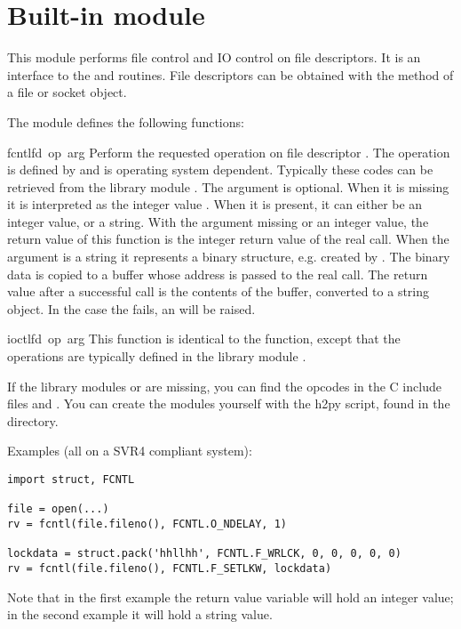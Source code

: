 \section{Built-in module }

This module performs file control and IO control on file descriptors.
It is an interface to the  and  \UNIX routines.
File descriptors can be obtained with the  method of a
file or socket object.

The module defines the following functions:

\renewcommand{\indexsubitem}{(in module struct)}

\begin{funcdesc}{fcntl}{fd\, op\, arg}
  Perform the requested operation on file descriptor .
  The operation is defined by  and is operating system
  dependent.  Typically these codes can be retrieved from the library
  module . The argument  is optional.  When
  it is missing it is interpreted as the integer value . When
  it is present, it can either be an integer value, or a string.  With
  the argument missing or an integer value, the return value of this
  function is the integer return value of the real 
  call.  When the argument is a string it represents a binary
  structure, e.g.  created by . The binary data is
  copied to a buffer whose address is passed to the real 
  call.  The return value after a successful call is the contents of
  the buffer, converted to a string object.  In the case the
   fails, an  will be raised.
\end{funcdesc}

\begin{funcdesc}{ioctl}{fd\, op\, arg}
  This function is identical to the  function, except
  that the operations are typically defined in the library module
  .
\end{funcdesc}

If the library modules  or  are missing, you
can find the opcodes in the C include files  and
. You can create the modules yourself with the h2py
script, found in the  directory.

Examples (all on a SVR4 compliant system):

\bcode\begin{verbatim}
import struct, FCNTL

file = open(...)
rv = fcntl(file.fileno(), FCNTL.O_NDELAY, 1)

lockdata = struct.pack('hhllhh', FCNTL.F_WRLCK, 0, 0, 0, 0, 0)
rv = fcntl(file.fileno(), FCNTL.F_SETLKW, lockdata)
\end{verbatim}\ecode

Note that in the first example the return value variable  will
hold an integer value; in the second example it will hold a string
value.
